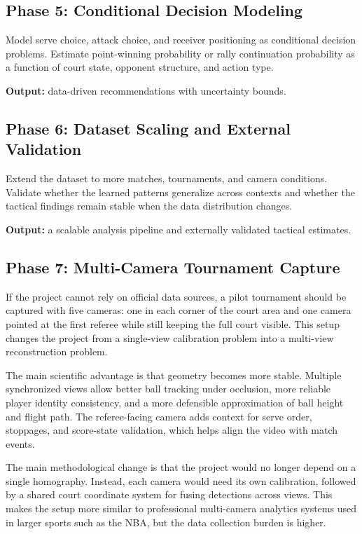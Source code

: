 \documentclass[a4paper]{article}
\begin{document}
\subsection{Phase 5: Conditional Decision Modeling}
Model serve choice, attack choice, and receiver positioning as conditional decision problems. Estimate point-winning probability or rally continuation probability as a function of court state, opponent structure, and action type.

\textbf{Output:} data-driven recommendations with uncertainty bounds.

\subsection{Phase 6: Dataset Scaling and External Validation}
Extend the dataset to more matches, tournaments, and camera conditions. Validate whether the learned patterns generalize across contexts and whether the tactical findings remain stable when the data distribution changes.

\textbf{Output:} a scalable analysis pipeline and externally validated tactical estimates.

\subsection{Phase 7: Multi-Camera Tournament Capture}
If the project cannot rely on official data sources, a pilot tournament should be captured with five cameras: one in each corner of the court area and one camera pointed at the first referee while still keeping the full court visible. This setup changes the project from a single-view calibration problem into a multi-view reconstruction problem.

The main scientific advantage is that geometry becomes more stable. Multiple synchronized views allow better ball tracking under occlusion, more reliable player identity consistency, and a more defensible approximation of ball height and flight path. The referee-facing camera adds context for serve order, stoppages, and score-state validation, which helps align the video with match events.

The main methodological change is that the project would no longer depend on a single homography. Instead, each camera would need its own calibration, followed by a shared court coordinate system for fusing detections across views. This makes the setup more similar to professional multi-camera analytics systems used in larger sports such as the NBA, but the data collection burden is higher.
\end{document}

